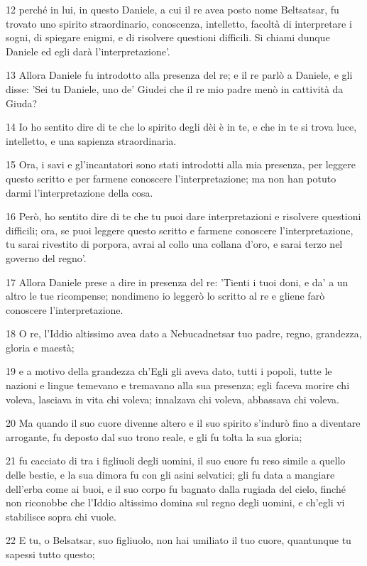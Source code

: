 \par 12 perché in lui, in questo Daniele, a cui il re avea posto nome Beltsatsar, fu trovato uno spirito straordinario, conoscenza, intelletto, facoltà di interpretare i sogni, di spiegare enigmi, e di risolvere questioni difficili. Si chiami dunque Daniele ed egli darà l'interpretazione'.
\par 13 Allora Daniele fu introdotto alla presenza del re; e il re parlò a Daniele, e gli disse: 'Sei tu Daniele, uno de' Giudei che il re mio padre menò in cattività da Giuda?
\par 14 Io ho sentito dire di te che lo spirito degli dèi è in te, e che in te si trova luce, intelletto, e una sapienza straordinaria.
\par 15 Ora, i savi e gl'incantatori sono stati introdotti alla mia presenza, per leggere questo scritto e per farmene conoscere l'interpretazione; ma non han potuto darmi l'interpretazione della cosa.
\par 16 Però, ho sentito dire di te che tu puoi dare interpretazioni e risolvere questioni difficili; ora, se puoi leggere questo scritto e farmene conoscere l'interpretazione, tu sarai rivestito di porpora, avrai al collo una collana d'oro, e sarai terzo nel governo del regno'.
\par 17 Allora Daniele prese a dire in presenza del re: 'Tienti i tuoi doni, e da' a un altro le tue ricompense; nondimeno io leggerò lo scritto al re e gliene farò conoscere l'interpretazione.
\par 18 O re, l'Iddio altissimo avea dato a Nebucadnetsar tuo padre, regno, grandezza, gloria e maestà;
\par 19 e a motivo della grandezza ch'Egli gli aveva dato, tutti i popoli, tutte le nazioni e lingue temevano e tremavano alla sua presenza; egli faceva morire chi voleva, lasciava in vita chi voleva; innalzava chi voleva, abbassava chi voleva.
\par 20 Ma quando il suo cuore divenne altero e il suo spirito s'indurò fino a diventare arrogante, fu deposto dal suo trono reale, e gli fu tolta la sua gloria;
\par 21 fu cacciato di tra i figliuoli degli uomini, il suo cuore fu reso simile a quello delle bestie, e la sua dimora fu con gli asini selvatici; gli fu data a mangiare dell'erba come ai buoi, e il suo corpo fu bagnato dalla rugiada del cielo, finché non riconobbe che l'Iddio altissimo domina sul regno degli uomini, e ch'egli vi stabilisce sopra chi vuole.
\par 22 E tu, o Belsatsar, suo figliuolo, non hai umiliato il tuo cuore, quantunque tu sapessi tutto questo;
